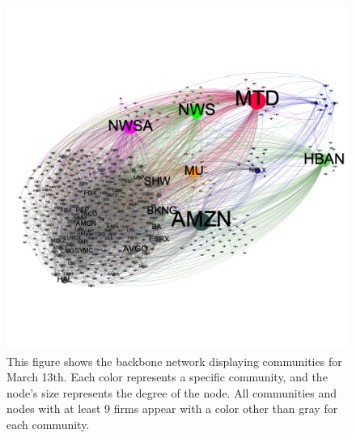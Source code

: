 
\begin{figure}[htb!]
  \centerline{\includegraphics[scale=0.5]{figures/EarnAnnounceTE/20180313mt-8colored-curved}}
  \caption{This figure shows the backbone network displaying communities for March 13th.  Each color represents a specific community, and the node's size represents the degree of the node.  All communities and nodes with at least 9 firms appear with a color other than gray for each community. }
  \label{fig:Community20180313full}
\end{figure}


